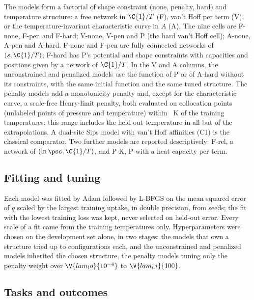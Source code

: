 \documentclass[journal=jcisd8,manuscript=article]{achemso}
\begin{document}
The models form a factorial of shape constraint (none, penalty, hard) and temperature structure: a free network in
$\C{1}/T$ (F), van't Hoff per term (V), or the temperature-invariant characteristic curve in $A$ (A). The nine cells
are F-none, F-pen and F-hard; V-none, V-pen and P (the hard van't Hoff cell); A-none, A-pen and A-hard. F-none and
F-pen are fully connected networks of $(s, \C{1}/T)$; F-hard has P's potential and shape constraints with capacities
and positions given by a network of $\C{1}/T$. In the V and A columns, the unconstrained and penalized models use
the function of P or of A-hard without its constraints, with the same initial function and the same tuned structure.
The penalty models add a monotonicity penalty and, except for the characteristic curve, a scale-free Henry-limit
penalty, both evaluated on collocation points (unlabeled points of pressure and temperature) within
~K of the training temperatures; this range includes the held-out temperature in all but
 of the  extrapolations. A dual-site Sips model with van't Hoff affinities (C1) is
the classical comparator. Two further models are reported descriptively: F-rel, a network of
$(\ln \pss, \C{1}/T)$, and P-K, P with a heat capacity per term.

\subsection*{Fitting and tuning}

Each model was fitted by Adam followed by L-BFGS on the mean squared error of $q$ scaled by the largest training
uptake, in double precision, from  seeds; the fit with the lowest training loss was kept, never
selected on held-out error. Every scale of a fit came from the training temperatures only. Hyperparameters were
chosen on the development set alone, in two stages: the models that own a structure tried up to
 configurations each, and the unconstrained and penalized models inherited the chosen structure, the
penalty models tuning only the penalty weight over $\V{lam_lo}{10^{-4}}$ to $\V{lam_hi}{100}$.

\subsection*{Tasks and outcomes}
\end{document}
